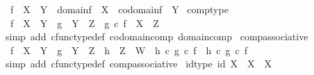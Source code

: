 \begin{isabellebody}
\ \ {\isachardoublequoteopen}{\isacharparenleft}{\kern0pt}f\ {\isacharcolon}{\kern0pt}\ X\ {\isasymrightarrow}\ Y{\isacharparenright}{\kern0pt}\ {\isasymlongleftrightarrow}\ {\isacharparenleft}{\kern0pt}domain{\isacharparenleft}{\kern0pt}f{\isacharparenright}{\kern0pt}\ {\isacharequal}{\kern0pt}\ X\ {\isasymand}\ codomain{\isacharparenleft}{\kern0pt}f{\isacharparenright}{\kern0pt}\ {\isacharequal}{\kern0pt}\ Y{\isacharparenright}{\kern0pt}{\isachardoublequoteclose}\isanewline
\isanewline
{}\isamarkupfalse%
\ comp{\isacharunderscore}{\kern0pt}type{\isacharcolon}{\kern0pt}\isanewline
\ \ {\isachardoublequoteopen}f\ {\isacharcolon}{\kern0pt}\ X\ {\isasymrightarrow}\ Y\ {\isasymLongrightarrow}\ g\ {\isacharcolon}{\kern0pt}\ Y\ {\isasymrightarrow}\ Z\ {\isasymLongrightarrow}\ g\ {\isasymcirc}\isactrlsub c\ f\ {\isacharcolon}{\kern0pt}\ X\ {\isasymrightarrow}\ Z{\isachardoublequoteclose}\isanewline
%
\isadelimproof
\ \ %
\endisadelimproof
%
\isatagproof
{}\isamarkupfalse%
\ {\isacharparenleft}{\kern0pt}simp\ add{\isacharcolon}{\kern0pt}\ cfunc{\isacharunderscore}{\kern0pt}type{\isacharunderscore}{\kern0pt}def\ codomain{\isacharunderscore}{\kern0pt}comp\ domain{\isacharunderscore}{\kern0pt}comp{\isacharparenright}{\kern0pt}%
\endisatagproof
{\isafoldproof}%
%
\isadelimproof
\isanewline
%
\endisadelimproof
\isanewline
{}\isamarkupfalse%
\ comp{\isacharunderscore}{\kern0pt}associative{}{\isacharcolon}{\kern0pt}\isanewline
\ \ {\isachardoublequoteopen}f\ {\isacharcolon}{\kern0pt}\ X\ {\isasymrightarrow}\ Y\ {\isasymLongrightarrow}\ g\ {\isacharcolon}{\kern0pt}\ Y\ {\isasymrightarrow}\ Z\ {\isasymLongrightarrow}\ h\ {\isacharcolon}{\kern0pt}\ Z\ {\isasymrightarrow}\ W\ {\isasymLongrightarrow}\ h\ {\isasymcirc}\isactrlsub c\ {\isacharparenleft}{\kern0pt}g\ {\isasymcirc}\isactrlsub c\ f{\isacharparenright}{\kern0pt}\ {\isacharequal}{\kern0pt}\ {\isacharparenleft}{\kern0pt}h\ {\isasymcirc}\isactrlsub c\ g{\isacharparenright}{\kern0pt}\ {\isasymcirc}\isactrlsub c\ f{\isachardoublequoteclose}\isanewline
%
\isadelimproof
\ \ %
\endisadelimproof
%
\isatagproof
{}\isamarkupfalse%
\ {\isacharparenleft}{\kern0pt}simp\ add{\isacharcolon}{\kern0pt}\ cfunc{\isacharunderscore}{\kern0pt}type{\isacharunderscore}{\kern0pt}def\ comp{\isacharunderscore}{\kern0pt}associative{\isacharparenright}{\kern0pt}%
\endisatagproof
{\isafoldproof}%
%
\isadelimproof
\isanewline
%
\endisadelimproof
\isanewline
{}\isamarkupfalse%
\ id{\isacharunderscore}{\kern0pt}type{\isacharcolon}{\kern0pt}\ {\isachardoublequoteopen}id\ X\ {\isacharcolon}{\kern0pt}\ X\ {\isasymrightarrow}\ X{\isachardoublequoteclose}\isanewline

\end{isabellebody}

